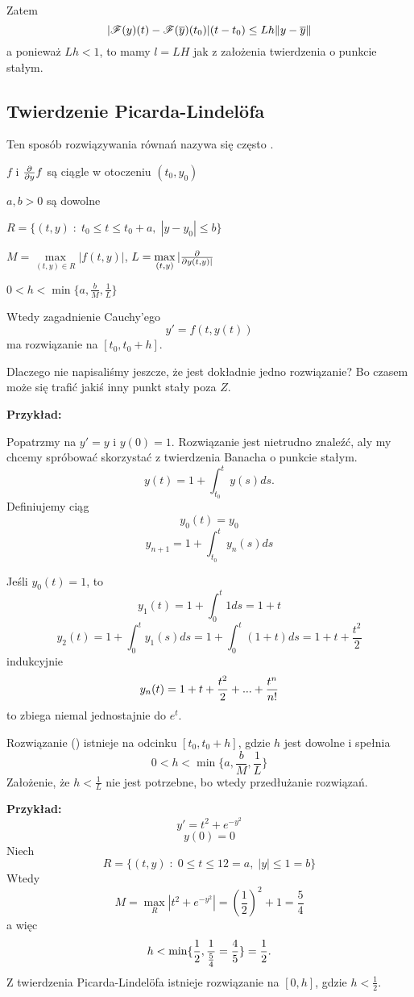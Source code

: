 Zatem
$$|\mathcal{F}(y)(t)-\mathcal{F}(\overline y)(t_0)|(t-t_0)\leq Lh\|y-\overline y\|$$
a ponieważ $Lh<1$, to mamy $l=LH$ jak z założenia twierdzenia o punkcie stałym.

\subsection{Twierdzenie Picarda-Lindel\"ofa}

Ten sposób rozwiązywania równań nazywa się często .
\medskip


\indent \point $f$ i ${\partial\over\partial y}f$ są ciągle w otoczeniu $(t_0,y_0)$

\indent \point $a,b>0$ są dowolne 

\indent \point $R=\{(t, y)\;:\;t_0\leq t\leq t_0+a,\;|y-y_0|\leq b\}$

\indent \point $M=\max\limits_{(t, y)\in R}|f(t, y)|$, $L=\max\limits_{(t, y)}|{\partial\over\partial y(t, y)|}$

\indent \point $0<h<\min\{a, \frac bM, \frac1L\}$


Wtedy zagadnienie Cauchy'ego
$$y'=f(t, y(t))$$
ma rozwiązanie na $[t_0,t_0+h]$.

Dlaczego nie napisaliśmy jeszcze, że jest dokładnie jedno rozwiązanie? Bo czasem może się trafić jakiś inny punkt stały poza $Z$.
\medskip

\textbf{Przykład:}

Popatrzmy na $y'=y$ i $y(0)=1$. Rozwiązanie jest nietrudno znaleźć, aly my chcemy spróbować skorzystać z twierdzenia Banacha o punkcie stałym.
$$y(t)=1+\int_{t_0}^ty(s)ds.$$
Definiujemy ciąg
$$y_0(t)=y_0$$
$$y_{n+1}=1+\int_{t_0}^ty_n(s)ds$$

Jeśli $y_0(t)=1$, to
$$y_1(t)=1+\int_{0}^t1ds=1+t$$
$$y_2(t)=1+\int_0^ty_1(s)ds=1+\int_0^t(1+t)ds=1+t+\frac{t^2}2$$
indukcyjnie
$$y_n(t)=1+t+\frac{t^2}2+...+{t^n\over n!}$$
to zbiega niemal jednostajnie do $e^t$.

 Rozwiązanie (\coffee) istnieje na odcinku $[t_0,t_0+h]$, gdzie $h$ jest dowolne i spełnia 
$$0<h<\min\{a, \frac bM, \frac1L\}$$
Założenie, że $h<\frac1L$ nie jest potrzebne, bo wtedy przedłużanie rozwiązań.
\medskip

\textbf{Przykład:}
$$y'=t^2+e^{-y^2}$$
$$y(0)=0$$
Niech
$$R=\{(t, y)\;:\;0\leq t\leq 12=a,\;|y|\leq 1=b\}$$
Wtedy 
$$M=\max_R|t^2+e^{-y^2}|=\left(\frac12\right)^2+1=\frac54$$
a więc 
$$h<\min\{\frac12, {1\over\frac54}=\frac45\}=\frac12.$$
Z twierdzenia Picarda-Lindel\"ofa istnieje rozwiązanie na $[0, h]$, gdzie $h<\frac12$.

